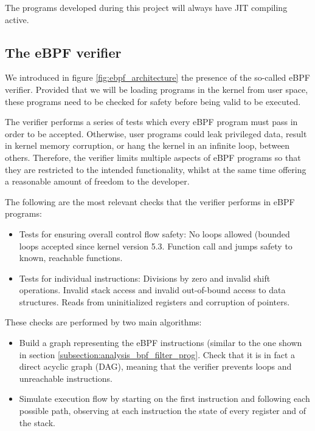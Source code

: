 \documentclass[12pt]{report} %
\begin{document}
The programs developed during this project will always have JIT compiling active.


\subsection{The eBPF verifier}
We introduced in figure \ref{fig:ebpf_architecture} the presence of the so-called eBPF verifier. Provided that we will be loading programs in the kernel from user space, these programs need to be checked for safety before being valid to be executed.

The verifier performs a series of tests which every eBPF program must pass in order to be accepted. Otherwise, user programs could leak privileged data, result in kernel memory corruption, or hang the kernel in an infinite loop, between others. Therefore, the verifier limits multiple aspects of eBPF programs so that they are restricted to the intended functionality, whilst at the same time offering a reasonable amount of freedom to the developer.

The following are the most relevant checks that the verifier performs in eBPF programs\cite{ebpf_verifier_kerneldocs}\cite{ebpf_JIT_demystify_page17-22}:
\begin{itemize}
\item Tests for ensuring overall control flow safety:
	\subitem No loops allowed (bounded loops accepted since kernel version 5.3\cite{ebpf_bounded_loops}.
	\subitem Function call and jumps safety to known, reachable functions.
\item Tests for individual instructions:
	 \subitem Divisions by zero and invalid shift operations.
	 \subitem Invalid stack access and invalid out-of-bound access to data structures.
	 \subitem Reads from uninitialized registers and corruption of pointers.
\end{itemize}

These checks are performed by two main algorithms:
\begin{itemize}
\item Build a graph representing the eBPF instructions (similar to the one shown in section \ref{subsection:analysis_bpf_filter_prog}. Check that it is in fact a direct acyclic graph (DAG), meaning that the verifier prevents loops and unreachable instructions.
\item Simulate execution flow by starting on the first instruction and following each possible path, observing at each instruction the state of every register and of the stack.
\end{itemize}
\end{document}
